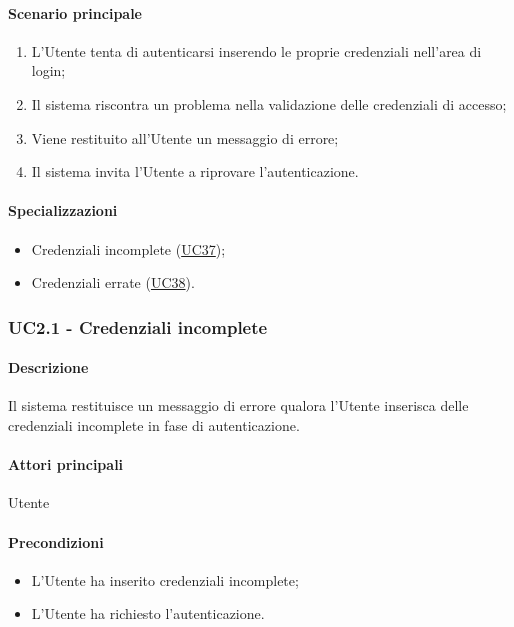 \paragraph*{Scenario principale}
\begin{enumerate}
  \item L'Utente tenta di autenticarsi inserendo le proprie credenziali nell'area di login;
  \item Il sistema riscontra un problema nella validazione delle credenziali di accesso;
  \item Viene restituito all'Utente un messaggio di errore;
  \item Il sistema invita l'Utente a riprovare l'autenticazione.
\end{enumerate}

\paragraph*{Specializzazioni}
\begin{itemize}
  \item Credenziali incomplete (\hyperref[UC37]{UC37});
  \item Credenziali errate (\hyperref[UC38]{UC38}).
\end{itemize}


\subsubsection{UC2.1 - Credenziali incomplete}\label{UC2point1}
\paragraph*{Descrizione}
Il sistema restituisce un messaggio di errore qualora l'Utente inserisca delle credenziali incomplete in fase di autenticazione.

\paragraph*{Attori principali}
Utente

\paragraph*{Precondizioni}
\begin{itemize}
  \item L'Utente ha inserito credenziali incomplete;
  \item L'Utente ha richiesto l'autenticazione. 
\end{itemize}

